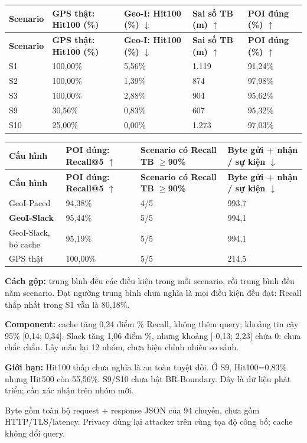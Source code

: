 \begingroup\small
\begin{longtable}{@{}P{1.618cm}P{3.741cm}P{3.741cm}P{3.640cm}P{3.336cm}@{}}
\toprule
\textbf{Scenario} & \textbf{GPS thật: Hit100 (\%)} & \textbf{Geo-I: Hit100 (\%) $\downarrow$} & \textbf{Sai số TB (m) $\uparrow$} & \textbf{POI đúng (\%) $\uparrow$}\\\midrule
\endfirsthead
\toprule
\textbf{Scenario} & \textbf{GPS thật: Hit100 (\%)} & \textbf{Geo-I: Hit100 (\%) $\downarrow$} & \textbf{Sai số TB (m) $\uparrow$} & \textbf{POI đúng (\%) $\uparrow$}\\\midrule
\endhead
\bottomrule\endfoot
S1 & 100,00\% & 5,56\% & 1.119 & 91,24\%\\
\addlinespace[3pt]
S2 & 100,00\% & 1,39\% & 874 & 97,98\%\\
\addlinespace[3pt]
S3 & 100,00\% & 2,88\% & 904 & 95,62\%\\
\addlinespace[3pt]
S9 & 30,56\% & 0,83\% & 607 & 95,32\%\\
\addlinespace[3pt]
S10 & 25,00\% & 0,00\% & 1.273 & 97,03\%\\
\end{longtable}
\endgroup
\begingroup\small
\begin{longtable}{@{}P{4.839cm}P{3.581cm}P{3.194cm}P{4.742cm}@{}}
\toprule
\textbf{Cấu hình} & \textbf{POI đúng: Recall@5 $\uparrow$} & \textbf{Scenario có Recall TB $\ge$90\%} & \textbf{Byte gửi + nhận / sự kiện $\downarrow$}\\\midrule
\endfirsthead
\toprule
\textbf{Cấu hình} & \textbf{POI đúng: Recall@5 $\uparrow$} & \textbf{Scenario có Recall TB $\ge$90\%} & \textbf{Byte gửi + nhận / sự kiện $\downarrow$}\\\midrule
\endhead
\bottomrule\endfoot
GeoI-Paced & 94,38\% & 4/5 & 993,7\\
\addlinespace[3pt]
\textbf{GeoI-Slack} & 95,44\% & 5/5 & 994,1\\
\addlinespace[3pt]
GeoI-Slack, bỏ cache & 95,19\% & 5/5 & 994,1\\
\addlinespace[3pt]
GPS thật & 100,00\% & 5/5 & 214,5\\
\end{longtable}
\endgroup
{}

\textbf{Cách gộp:} trung bình đều các điều kiện trong mỗi scenario, rồi trung bình đều năm scenario. Đạt ngưỡng trung bình chưa nghĩa là mọi điều kiện đều đạt: Recall thấp nhất trong S1 vẫn là 80,18\%.

\textbf{Component:} cache tăng 0,24 điểm \% Recall, không thêm query; khoảng tin cậy 95\% [0,14; 0,34]. Slack tăng 1,06 điểm \%, nhưng khoảng [-0,13; 2,23] chứa 0: chưa chắc chắn. Lấy mẫu lại 12 nhóm, chưa hiệu chỉnh nhiều so sánh.

\textbf{Giới hạn:} Hit100 thấp chưa nghĩa là an toàn tuyệt đối. Ở S9, Hit100=0,83\% nhưng Hit500 còn 55,56\%. S9/S10 chưa bật BR-Boundary. Đây là dữ liệu phát triển; cần xác nhận trên nhóm mới.

Byte gồm toàn bộ request + response JSON của 94 chuyến, chưa gồm HTTP/TLS/latency. Privacy dùng lại attacker trên cùng tọa độ công bố; cache không đổi query.

